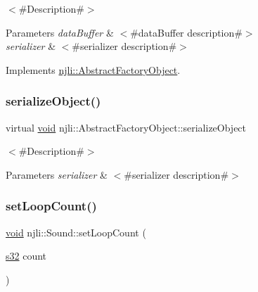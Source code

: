 $<$\#\+Description\#$>$


\begin{DoxyParams}{Parameters}
{\em data\+Buffer} & $<$\#data\+Buffer description\#$>$ \\
\hline
{\em serializer} & $<$\#serializer description\#$>$ \\
\hline
\end{DoxyParams}


Implements \mbox{\hyperlink{classnjli_1_1_abstract_factory_object_aad2fbe86fb3bdecf02918a96b9c57976}{njli\+::\+Abstract\+Factory\+Object}}.

\mbox{\label{classnjli_1_1_sound_a4fc4bcd9d1930911474210c047372fc0}} 
\subsubsection{\texorpdfstring{serialize\+Object()}{serializeObject()}}
{\footnotesize\ttfamily virtual \mbox{\hyperlink{_thread_8h_af1e856da2e658414cb2456cb6f7ebc66}{void}} njli\+::\+Abstract\+Factory\+Object\+::serialize\+Object}

$<$\#\+Description\#$>$


\begin{DoxyParams}{Parameters}
{\em serializer} & $<$\#serializer description\#$>$ \\
\hline
\end{DoxyParams}
\mbox{\label{classnjli_1_1_sound_a0b08a237f722aec6daa46c364026834d}} 
\subsubsection{\texorpdfstring{set\+Loop\+Count()}{setLoopCount()}}
{\footnotesize\ttfamily \mbox{\hyperlink{_thread_8h_af1e856da2e658414cb2456cb6f7ebc66}{void}} njli\+::\+Sound\+::set\+Loop\+Count (\begin{DoxyParamCaption}\item[{\mbox{\hyperlink{_util_8h_aa62c75d314a0d1f37f79c4b73b2292e2}{s32}}}]{count }\end{DoxyParamCaption})}

\mbox{\label{classnjli_1_1_sound_a087eb5f8d9f51cc476f12f1d10a3cb95}} 
